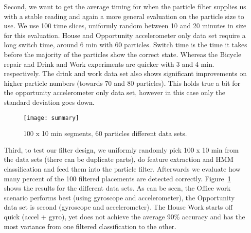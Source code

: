 Second, we want to get the average timing for when the particle filter
supplies us with a stable reading and again a more general evaluation
on the particle size to use.  We use 100 time slices, uniformly random
between 10 and 20 minutes in size for this evaluation. House and
Opportunity accelerometer only data set require a long switch
time, around 6 min with 60 particles. Switch time is the time it takes before the majority of the particles show the
correct state. Whereas
the Bicycle repair and Drink and Work experiments are quicker with 3
and 4 min.  respectively. The drink and work data set also shows
significant improvements on higher particle numbers (towards 70 and 80
particles).  This holds true a bit for the opportunity accelerometer
only data set, however in this case only the standard deviation goes
down.

\begin{figure}[!t]
\centering
\texttt{[image: summary]}
\caption{100 x 10 min segments, 60 particles different data sets.}
\label{fig_summary}
\end{figure}

Third, to test our filter design, we uniformly randomly pick 100 x 10
min from the data sets (there can be duplicate parts), do feature
extraction and HMM classification and feed them into the particle
filter. Afterwards we evaluate how many percent of the 100 filtered
placements are detected correctly.  Figure~\ref{fig_summary} shows the
results for the different data sets.  As can be seen, the Office work
scenario performs best (using gyroscope and accelerometer), the Opportunity
data set is second (gyroscope and accelerometer).  The House Work starts off
quick (accel + gyro), yet does not achieve the average 90\% accuracy
and has the most variance from one filtered classification to the
other.





